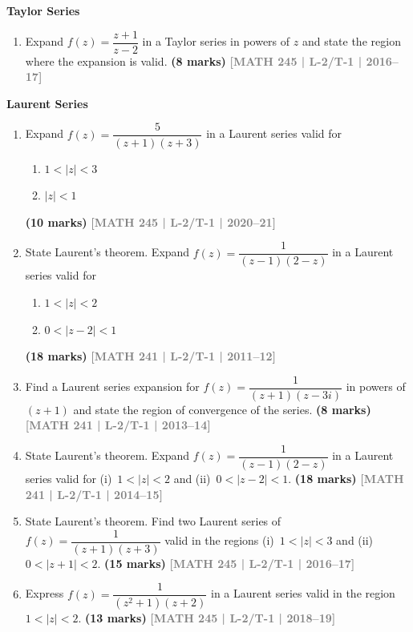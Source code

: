 \documentclass[12pt,a4paper]{article}
\newcommand{\yr}[1]{\hfill\textcolor{gray}{\small\textbf{[#1]}}}
\newcommand{\mk}[1]{\textcolor{orange!70!black}{\small\textbf{(#1 marks)}}}
\newcommand{\subtopic}[2]{%
  \vspace{10pt}
  \noindent\begin{tcolorbox}[colback=#1!8,colframe=#1,boxrule=0.6pt,arc=4pt,
    left=6pt,right=6pt,top=4pt,bottom=4pt]
    \small\bfseries\textcolor{#1}{#2}
  \end{tcolorbox}
  \vspace{2pt}
}
\begin{document}
\subtopic{cE}{Taylor Series}
\label{sub:s5-taylor}

\begin{enumerate}

\item Expand $f(z)=\dfrac{z+1}{z-2}$ in a Taylor series in powers of $z$ and state the region where the expansion is valid.
\mk{8} \yr{MATH 245 | L-2/T-1 | 2016--17}

\end{enumerate}

\subtopic{cE}{Laurent Series}
\label{sub:s5-laurent}

\begin{enumerate}

\item Expand $f(z)=\dfrac{5}{(z+1)(z+3)}$ in a Laurent series valid for
\begin{enumerate}
  \item $1<|z|<3$
  \item $|z|<1$
\end{enumerate}
\mk{10} \yr{MATH 245 | L-2/T-1 | 2020--21}

\item State Laurent's theorem. Expand $f(z)=\dfrac{1}{(z-1)(2-z)}$ in a Laurent series valid for
\begin{enumerate}
  \item $1<|z|<2$
  \item $0<|z-2|<1$
\end{enumerate}
\mk{18} \yr{MATH 241 | L-2/T-1 | 2011--12}

\item Find a Laurent series expansion for $f(z)=\dfrac{1}{(z+1)(z-3i)}$ in powers of $(z+1)$ and state the region of convergence of the series.
\mk{8} \yr{MATH 241 | L-2/T-1 | 2013--14}

\item State Laurent's theorem. Expand $f(z)=\dfrac{1}{(z-1)(2-z)}$ in a Laurent series valid for (i)~$1<|z|<2$ and (ii)~$0<|z-2|<1$.
\mk{18} \yr{MATH 241 | L-2/T-1 | 2014--15}

\item State Laurent's theorem. Find two Laurent series of $f(z)=\dfrac{1}{(z+1)(z+3)}$ valid in the regions (i)~$1<|z|<3$ and (ii)~$0<|z+1|<2$.
\mk{15} \yr{MATH 245 | L-2/T-1 | 2016--17}

\item Express $f(z)=\dfrac{1}{(z^{2}+1)(z+2)}$ in a Laurent series valid in the region $1<|z|<2$.
\mk{13} \yr{MATH 245 | L-2/T-1 | 2018--19}


\end{enumerate}
\end{document}
